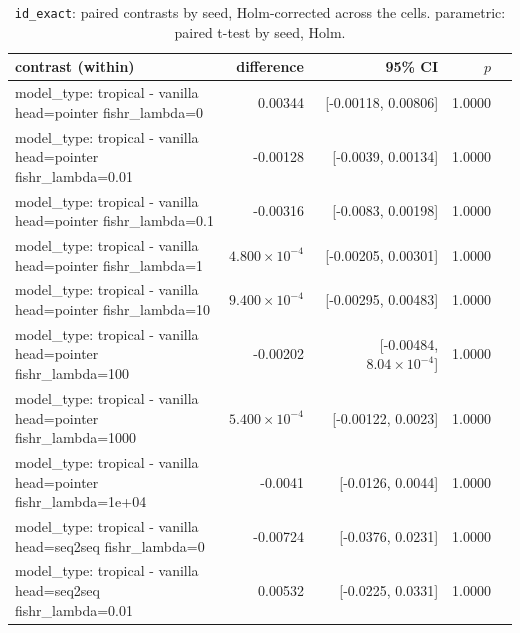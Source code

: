 \documentclass[10pt]{article}
\makeatletter
\newcommand{\stackcell}[1]{\begin{tabular}[t]{@{}l@{}}#1\end{tabular}}
\makeatother
\begin{document}
{\small
\begin{longtable}{lrrrl}
\caption{\texttt{id\_exact}: paired contrasts by seed, Holm-corrected across the cells. parametric: paired t-test by seed, Holm.}\label{tab:paired-id_exact}\\
\toprule
contrast (within) & difference & 95\% CI & $p$ & \\
\midrule
\endhead
\stackcell{model\_type: tropical - vanilla\\\footnotesize head=pointer fishr\_lambda=0 } & 0.00344 & [-0.00118, 0.00806] & 1.0000 & \\
\stackcell{model\_type: tropical - vanilla\\\footnotesize head=pointer fishr\_lambda=0.01 } & -0.00128 & [-0.0039, 0.00134] & 1.0000 & \\
\stackcell{model\_type: tropical - vanilla\\\footnotesize head=pointer fishr\_lambda=0.1 } & -0.00316 & [-0.0083, 0.00198] & 1.0000 & \\
\stackcell{model\_type: tropical - vanilla\\\footnotesize head=pointer fishr\_lambda=1 } & $4.800\times10^{-4}$ & [-0.00205, 0.00301] & 1.0000 & \\
\stackcell{model\_type: tropical - vanilla\\\footnotesize head=pointer fishr\_lambda=10 } & $9.400\times10^{-4}$ & [-0.00295, 0.00483] & 1.0000 & \\
\stackcell{model\_type: tropical - vanilla\\\footnotesize head=pointer fishr\_lambda=100 } & -0.00202 & [-0.00484, $8.04\times10^{-4}$] & 1.0000 & \\
\stackcell{model\_type: tropical - vanilla\\\footnotesize head=pointer fishr\_lambda=1000 } & $5.400\times10^{-4}$ & [-0.00122, 0.0023] & 1.0000 & \\
\stackcell{model\_type: tropical - vanilla\\\footnotesize head=pointer fishr\_lambda=1e+04 } & -0.0041 & [-0.0126, 0.0044] & 1.0000 & \\
\stackcell{model\_type: tropical - vanilla\\\footnotesize head=seq2seq fishr\_lambda=0 } & -0.00724 & [-0.0376, 0.0231] & 1.0000 & \\
\stackcell{model\_type: tropical - vanilla\\\footnotesize head=seq2seq fishr\_lambda=0.01 } & 0.00532 & [-0.0225, 0.0331] & 1.0000 & \\

\end{longtable}}
\end{document}
